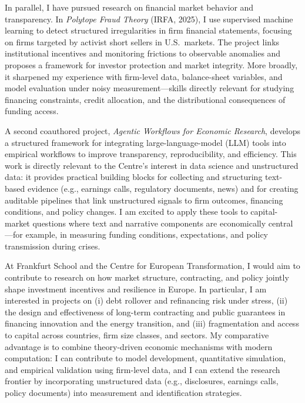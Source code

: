 \documentclass[11pt]{article}
\begin{document}
In parallel, I have pursued research on financial market behavior and transparency. 
In \textit{Polytope Fraud Theory} (IRFA, 2025), I use supervised machine learning to detect structured irregularities in firm financial statements, focusing on firms targeted by activist short sellers in U.S.\ markets. 
The project links institutional incentives and monitoring frictions to observable anomalies and proposes a framework for investor protection and market integrity. 
More broadly, it sharpened my experience with firm-level data, balance-sheet variables, and model evaluation under noisy measurement---skills directly relevant for studying financing constraints, credit allocation, and the distributional consequences of funding access.

A second coauthored project, \textit{Agentic Workflows for Economic Research}, develops a structured framework for integrating large-language-model (LLM) tools into empirical workflows to improve transparency, reproducibility, and efficiency. 
This work is directly relevant to the Centre's interest in data science and unstructured data: it provides practical building blocks for collecting and structuring text-based evidence (e.g., earnings calls, regulatory documents, news) and for creating auditable pipelines that link unstructured signals to firm outcomes, financing conditions, and policy changes. 
I am excited to apply these tools to capital-market questions where text and narrative components are economically central---for example, in measuring funding conditions, expectations, and policy transmission during crises.

At Frankfurt School and the Centre for European Transformation, I would aim to contribute to research on how market structure, contracting, and policy jointly shape investment incentives and resilience in Europe. 
In particular, I am interested in projects on (i) debt rollover and refinancing risk under stress, (ii) the design and effectiveness of long-term contracting and public guarantees in financing innovation and the energy transition, and (iii) fragmentation and access to capital across countries, firm size classes, and sectors. 
My comparative advantage is to combine theory-driven economic mechanisms with modern computation: I can contribute to model development, quantitative simulation, and empirical validation using firm-level data, and I can extend the research frontier by incorporating unstructured data (e.g., disclosures, earnings calls, policy documents) into measurement and identification strategies.
\end{document}
